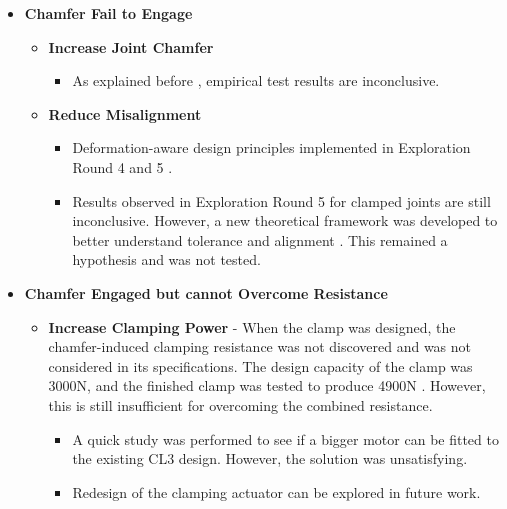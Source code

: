 \begin{itemize}
    \item \textbf{Chamfer Fail to Engage}
    \begin{itemize}[nosep]
        \item \textbf{Increase Joint Chamfer}
        \begin{itemize}
            \item As explained before , empirical test results are inconclusive.
        \end{itemize}
        \item \textbf{Reduce Misalignment}
        \begin{itemize}
            \item Deformation-aware design principles implemented in Exploration Round 4 and 5 .
            \item Results observed in Exploration Round 5 for clamped joints are still inconclusive. However, a new theoretical framework was developed to better understand tolerance and alignment . This remained a hypothesis and was not tested.
        \end{itemize}
    \end{itemize}

    \item \textbf{Chamfer Engaged but cannot Overcome Resistance}
    \begin{itemize}[nosep]
        \item \textbf{Increase Clamping Power }- When the clamp was designed, the chamfer-induced clamping resistance was not discovered and was not considered in its specifications. The design capacity of the clamp was 3000N, and the finished clamp was tested to produce 4900N . However, this is still insufficient for overcoming the combined resistance.
        \begin{itemize}
            \item A quick study was performed to see if a bigger motor can be fitted to the existing CL3 design. However, the solution was unsatisfying.
            \item Redesign of the clamping actuator can be explored in future work.
        \end{itemize}
    \end{itemize}
\end{itemize}

